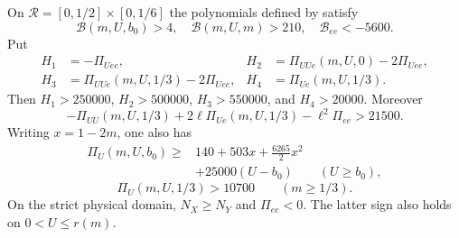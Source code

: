 \begin{lemma}
\label{lem:f-explicit-comparison-bounds}
On $\mathcal R=[0,1/2]\times[0,1/6]$ the polynomials defined by
 satisfy
\[
 \mathcal B(m,U,b_0)>4,\quad \mathcal B(m,U,m)>210,
 \quad \mathcal B_{ee}<-5600.
\]
Put
\[
 \begin{aligned}
 H_1&=-\Pi_{Uee},&
 H_2&=\Pi_{UUe}(m,U,0)-2\Pi_{Uee},\\
 H_3&=\Pi_{UUe}(m,U,1/3)-2\Pi_{Uee},&
 H_4&=\Pi_{Ue}(m,U,1/3).
 \end{aligned}
\]
Then $H_1>250000$, $H_2>500000$, $H_3>550000$, and $H_4>20000$.
Moreover
\[
 -\Pi_{UU}(m,U,1/3)+2\ell\Pi_{Ue}(m,U,1/3)-\ell^2\Pi_{ee}>21500.
\]
Writing $x=1-2m$, one also has
\[
 \begin{split}
 \Pi_U(m,U,b_0)\ge{}&140+503x+\frac{6265}{2}x^2\\
 &+25000(U-b_0)\qquad(U\ge b_0),
 \end{split}
\]
\[
 \Pi_U(m,U,1/3)>10700\qquad(m\ge1/3).
\]
On the strict physical domain, $N_X\ge N_Y$ and $\Pi_{ee}<0$.
The latter sign also holds on $0<U\le r(m)$.
\end{lemma}
